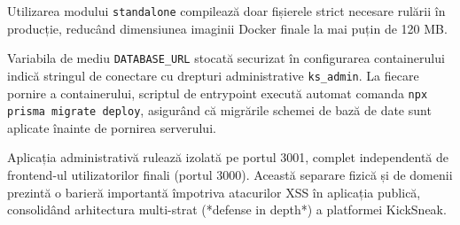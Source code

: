 Utilizarea modului \texttt{standalone} compilează doar fișierele strict necesare rulării în producție, reducând dimensiunea imaginii Docker finale la mai puțin de 120 MB.

Variabila de mediu \texttt{DATABASE\_URL} stocată securizat în configurarea containerului indică stringul de conectare cu drepturi administrative \texttt{ks\_admin}. La fiecare pornire a containerului, scriptul de entrypoint execută automat comanda \texttt{npx prisma migrate deploy}, asigurând că migrările schemei de bază de date sunt aplicate înainte de pornirea serverului.

Aplicația administrativă rulează izolată pe portul 3001, complet independentă de frontend-ul utilizatorilor finali (portul 3000). Această separare fizică și de domenii prezintă o barieră importantă împotriva atacurilor XSS în aplicația publică, consolidând arhitectura multi-strat (*defense in depth*) a platformei KickSneak.
